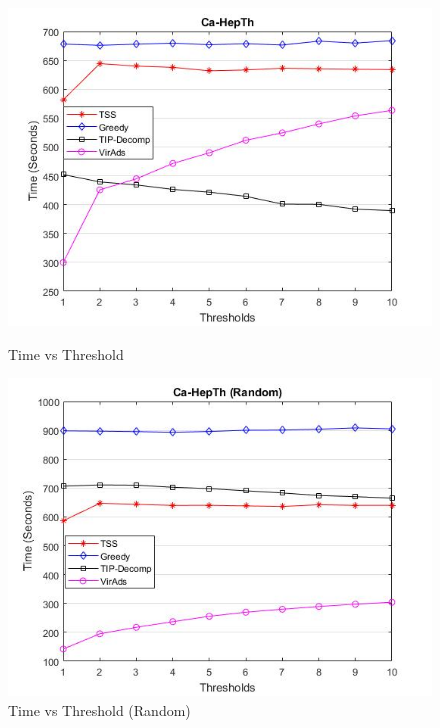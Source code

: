 \begin{figure}[h!]
\begin{minipage}[t]{0.50\textwidth}
\includegraphics[width=\linewidth,keepaspectratio=true]{images/ca-hepthtime.jpg}
\caption{Time vs Threshold}

\end{minipage}
\begin{minipage}[t]{0.50\textwidth}
\includegraphics[width=\linewidth,keepaspectratio=true]{images/ca-hepthrandomtime.jpg}
\caption{Time vs Threshold (Random)}
\end{minipage}
\end{figure}
